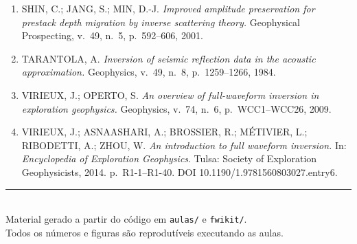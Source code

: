 \documentclass[11pt,a4paper,oneside]{report}
\newcommand{\arq}[1]{\texttt{\small #1}}
\begin{document}
\begin{enumerate}[leftmargin=*,itemsep=3pt]
\item SHIN, C.; JANG, S.; MIN, D.-J. \emph{Improved amplitude preservation for
prestack depth migration by inverse scattering theory.} Geophysical
Prospecting, v.~49, n.~5, p.~592--606, 2001.

\item TARANTOLA, A. \emph{Inversion of seismic reflection data in the acoustic
approximation.} Geophysics, v.~49, n.~8, p.~1259--1266, 1984.

\item VIRIEUX, J.; OPERTO, S. \emph{An overview of full-waveform inversion in
exploration geophysics.} Geophysics, v.~74, n.~6, p.~WCC1--WCC26, 2009.

\item VIRIEUX, J.; ASNAASHARI, A.; BROSSIER, R.; MÉTIVIER, L.; RIBODETTI, A.;
ZHOU, W. \emph{An introduction to full waveform inversion.} In:
\emph{Encyclopedia of Exploration Geophysics}. Tulsa: Society of Exploration
Geophysicists, 2014. p.~R1-1--R1-40. DOI 10.1190/1.9781560803027.entry6.
\end{enumerate}

\vfill
\begin{center}
{\color{cianofwi}\rule{0.55\textwidth}{1pt}}\\[0.35cm]
{\small Material gerado a partir do código em \arq{aulas/} e \arq{fwikit/}.\\
Todos os números e figuras são reprodutíveis executando as aulas.}
\end{center}
\end{document}
